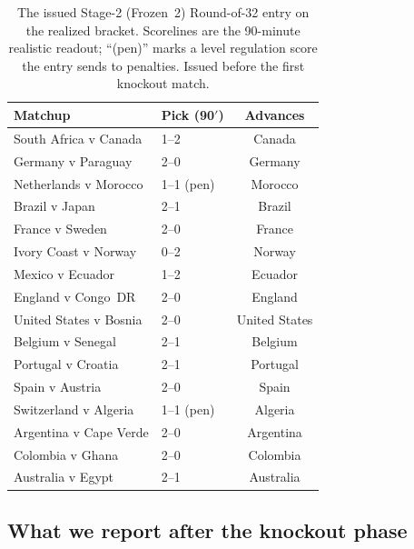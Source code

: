 \begin{table}[t]
  \centering
  \small
  \caption{The issued Stage-2 (Frozen~2) Round-of-32 entry on the realized
    bracket. Scorelines are the 90-minute realistic readout; ``(pen)'' marks a
    level regulation score the entry sends to penalties. Issued before the first
    knockout match.}
  \label{tab:stage2-r32}
  \begin{tabular}{llc}
    \toprule
    Matchup & Pick (90$'$) & Advances \\
    \midrule
    South Africa v Canada       & 1--2       & Canada \\
    Germany v Paraguay          & 2--0       & Germany \\
    Netherlands v Morocco       & 1--1 (pen) & Morocco \\
    Brazil v Japan              & 2--1       & Brazil \\
    France v Sweden             & 2--0       & France \\
    Ivory Coast v Norway        & 0--2       & Norway \\
    Mexico v Ecuador            & 1--2       & Ecuador \\
    England v Congo~DR          & 2--0       & England \\
    United States v Bosnia      & 2--0       & United States \\
    Belgium v Senegal           & 2--1       & Belgium \\
    Portugal v Croatia          & 2--1       & Portugal \\
    Spain v Austria             & 2--0       & Spain \\
    Switzerland v Algeria       & 1--1 (pen) & Algeria \\
    Argentina v Cape Verde      & 2--0       & Argentina \\
    Colombia v Ghana            & 2--0       & Colombia \\
    Australia v Egypt           & 2--1       & Australia \\
    \bottomrule
  \end{tabular}
\end{table}

\subsection{What we report after the knockout phase}\label{sec:stage2-results}

